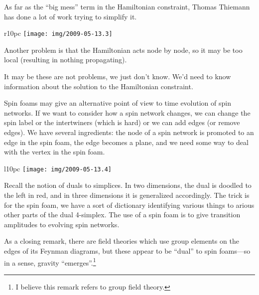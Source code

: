 As far as the ``big mess'' term in the Hamiltonian constraint, Thomas
Thiemann has done a lot of work trying to simplify it.

\begin{wrapfigure}{r}{10pc}
\centering\vskip-1pc
\texttt{[image: img/2009-05-13.3]}
\end{wrapfigure}
Another problem is that the Hamiltonian acts node by node, so it may be
too local (resulting in nothing propagating).

It may be these are not problems, we just don't know. We'd need to know
information about the solution to the Hamiltonian constraint.

Spin foams may give an alternative point of view to time evolution of
spin networks. If we want to consider how a spin network changes, we can
change the spin label or the intertwiners (which is hard) or we can add
edges (or remove edges). We have several ingredients: the node of a spin
network is promoted to an edge in the spin foam, the edge becomes a
plane, and we need some way to deal with the vertex in the spin foam.%


\begin{wrapfigure}{l}{10pc}
\centering\vskip-1pc
\texttt{[image: img/2009-05-13.4]}
\end{wrapfigure}
Recall the notion of duals to simplices. In two dimensions, the dual is
doodled to the left in red, and in three dimensions it is generalized
accordingly. The trick is for the spin foam, we have a sort of
dictionary identifying various things to arious other parts of the dual
4-simplex. The use of a spin foam is to give transition amplitudes to
evolving spin networks.

As a closing remark, there are field theories which use group elements
on the edges of its Feynman diagrams, but these appear to be ``dual'' to
spin foams---so in a sense, gravity ``emerges''.\footnote{I believe this
remark refers to group field theory.}
